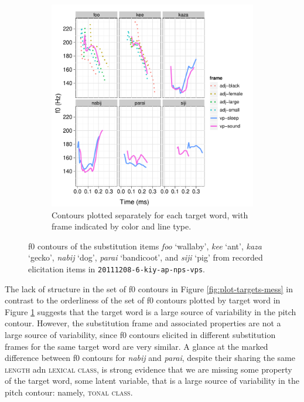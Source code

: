\documentclass[12pt]{article}
\begin{document}
\begin{figure}[h]
  \begin{subfigure}[t]{0.7\textwidth}
    \centering
    \includegraphics[width=\textwidth]{kiy-20111208-plot-targets-niso}%
    \caption{Contours plotted separately for each target word, with
      frame indicated by color and line type.}
    \label{fig:plot-targets-facet}
  \end{subfigure}
  \caption{f0 contours of the substitution items \textit{foo} `wallaby',
    \textit{kee} `ant', \textit{kaza} `gecko', \textit{nabij} `dog',
    \textit{parai} `bandicoot', and \textit{siji} `pig'  from recorded elicitation
    items in \texttt{20111208-6-kiy-ap-nps-vps}.}\label{fig:plot-targets}
\end{figure}

\clearpage

The lack of structure in the set of f0 contours in Figure
\ref{fig:plot-targets-mess} in contrast to the orderliness of the set of f0 contours plotted by
target word in Figure \ref{fig:plot-targets-facet} suggests that the
target word is a large source of variability in the pitch contour. However, the substitution frame and associated properties are not a
large source of variability, since f0 contours elicited in different
substitution frames for the same target word are very similar.      
A glance at the marked difference between f0 contours for \textit{nabij} and
\textit{parai}, despite their sharing the same
\textsc{length} adn \textsc{lexical class}, is strong evidence that we are
missing some property of the target word, some latent variable, that is a large source of
variability in the pitch contour: namely, \textsc{tonal class}. 
\end{document}
